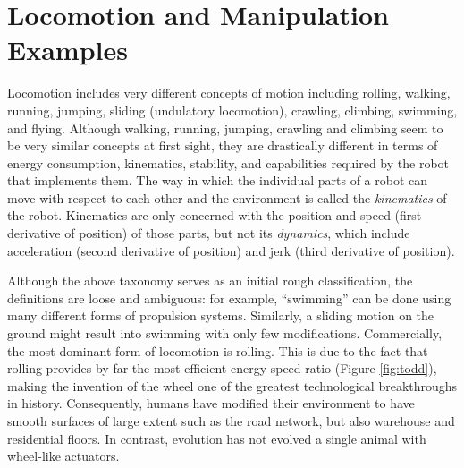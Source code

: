 \section{Locomotion and Manipulation Examples}
Locomotion includes very different concepts of motion including rolling, walking, running, jumping, sliding (undulatory locomotion), crawling, climbing, swimming, and flying. Although walking, running, jumping, crawling and climbing seem to be very similar concepts at first sight, they are drastically different in terms of energy consumption, kinematics, stability, and capabilities required by the robot that implements them. The way in which the individual parts of a robot can move with respect to each other and the environment is called the \emph{kinematics} of the robot. Kinematics are only concerned with the position and speed (first derivative of position) of those parts, but not its \emph{dynamics}, which include acceleration (second derivative of position) and jerk (third derivative of position).
%

Although the above taxonomy serves as an initial rough classification, the definitions are loose and ambiguous: for example, ``swimming'' can be done using many different forms of propulsion systems. Similarly, a sliding motion on the ground might result into swimming with only few modifications. Commercially, the most dominant form of locomotion is rolling. This is due to the fact that rolling provides by far the most efficient energy-speed ratio (Figure \ref{fig:todd}), making the invention of the wheel one of the greatest technological breakthroughs in history. Consequently, humans have modified their environment to have smooth surfaces of large extent such as the road network, but also warehouse and residential floors. In contrast, evolution has not evolved a single animal with wheel-like actuators.

